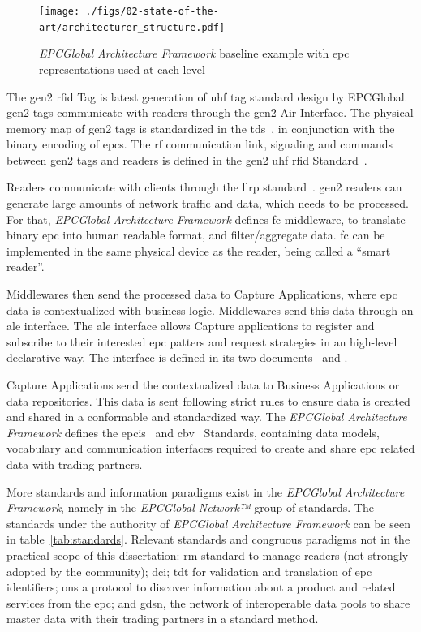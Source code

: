 \begin{figure}[!ht]
    \centering
    \texttt{[image: ./figs/02-state-of-the-art/architecturer\_structure.pdf]}
    \caption[\emph{EPCGlobal Architecture Framework} baseline example with \ac{epc} representations used at each level]{\emph{EPCGlobal Architecture Framework} baseline example with \ac{epc} representations used at each level~\cite{EPCTagData}} 
    \label{fig:archstructure}
\end{figure}

The \ac{gen2} \ac{rfid} Tag is latest generation of \ac{uhf} tag standard design by EPCGlobal. \ac{gen2} tags communicate with readers through the \ac{gen2} Air Interface. The physical memory map of \ac{gen2} tags is standardized in the \ac{tds}~\cite{EPCTagData}, in conjunction with the binary encoding of \acp{epc}. The \ac{rf} communication link, signaling and commands between \ac{gen2} tags and readers is defined in the \ac{gen2} \ac{uhf} \ac{rfid} Standard~\cite{UHFGen2Tag}.

Readers communicate with clients through the \ac{llrp} standard~\cite{LowLevelReader}. \ac{gen2} readers can generate large amounts of network traffic and data, which needs to be processed. For that, \emph{EPCGlobal Architecture Framework} defines \acf{fc} middleware, to translate binary \acs{epc} into human readable format, and filter/aggregate data. \ac{fc} can be implemented in the same physical device as the reader, being called a ``smart reader''. 

Middlewares then send the processed data to Capture Applications, where \ac{epc} data is contextualized with business logic. Middlewares send this data through an \ac{ale} interface. The \ac{ale} interface allows Capture applications to register and subscribe to their interested \ac{epc} patters and request strategies in an high-level declarative way. The interface is defined in its two documents~\cite{ApplicationLevelEvents} and \cite{ApplicationLevelEventsa}.

Capture Applications send the contextualized data to Business Applications or data repositories.
This data is sent following strict rules to ensure data is created and shared in a conformable and standardized way. The \emph{EPCGlobal Architecture Framework} defines the \ac{epcis}~\cite{EPCInformationServices} and \ac{cbv}~\cite{CoreBusinessVocabulary} Standards, containing data models, vocabulary and communication interfaces required to create and share \ac{epc} related data with trading partners.

More standards and information paradigms exist in the \emph{EPCGlobal Architecture Framework}, namely in the \emph{EPCGlobal Network™} group of standards. The standards under the authority of \emph{EPCGlobal Architecture Framework} can be seen in table~\ref{tab:standards}. Relevant standards and congruous paradigms not in the practical scope of this dissertation: \acf{rm} standard to manage readers (not strongly adopted by the community); \acf{dci}; \acf{tdt} for validation and translation of \ac{epc} identifiers; \ac{ons} a protocol to discover information about a product and related services from the \ac{epc}; and \acf{gdsn}, the network of interoperable data pools to share master data with their trading partners in a standard method. 

